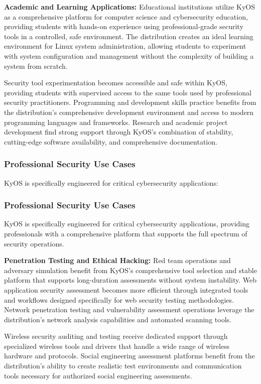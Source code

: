 \documentclass[12pt,a4paper]{article}
\begin{document}
\textbf{Academic and Learning Applications:}
Educational institutions utilize KyOS as a comprehensive platform for computer science and cybersecurity education, providing students with hands-on experience using professional-grade security tools in a controlled, safe environment. The distribution creates an ideal learning environment for Linux system administration, allowing students to experiment with system configuration and management without the complexity of building a system from scratch.

Security tool experimentation becomes accessible and safe within KyOS, providing students with supervised access to the same tools used by professional security practitioners. Programming and development skills practice benefits from the distribution's comprehensive development environment and access to modern programming languages and frameworks. Research and academic project development find strong support through KyOS's combination of stability, cutting-edge software availability, and comprehensive documentation.

\subsubsection{Professional Security Use Cases}
KyOS is specifically engineered for critical cybersecurity applications:

\subsubsection{Professional Security Use Cases}
KyOS is specifically engineered for critical cybersecurity applications, providing professionals with a comprehensive platform that supports the full spectrum of security operations.

\textbf{Penetration Testing and Ethical Hacking:}
Red team operations and adversary simulation benefit from KyOS's comprehensive tool selection and stable platform that supports long-duration assessments without system instability. Web application security assessment becomes more efficient through integrated tools and workflows designed specifically for web security testing methodologies. Network penetration testing and vulnerability assessment operations leverage the distribution's network analysis capabilities and automated scanning tools.

Wireless security auditing and testing receive dedicated support through specialized wireless tools and drivers that handle a wide range of wireless hardware and protocols. Social engineering assessment platforms benefit from the distribution's ability to create realistic test environments and communication tools necessary for authorized social engineering assessments.
\end{document}
